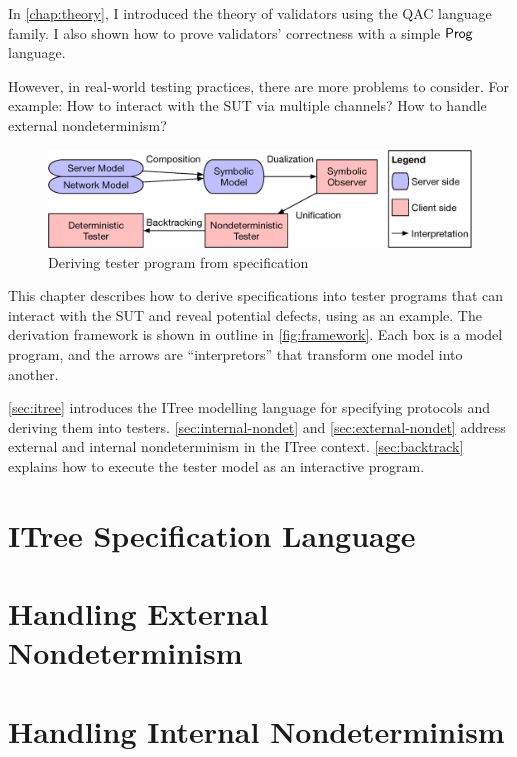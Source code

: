 In \autoref{chap:theory}, I introduced the theory of validators using the QAC
language family.  I also shown how to prove validators' correctness with a
simple $\mathsf{Prog}$ language.

However, in real-world testing practices, there are more problems to consider.
For example: How to interact with the SUT via multiple channels?  How to handle
external nondeterminism?

\begin{figure}
  \includegraphics[width=\linewidth]{figures/framework}
  \caption{Deriving tester program from specification}
  \label{fig:framework}
\end{figure}

This chapter describes how to derive specifications into tester programs that
can interact with the SUT and reveal potential defects, using \http as an
example.  The derivation framework is shown in outline in
\autoref{fig:framework}.  Each box is a model program, and the arrows are
``interpretors'' that transform one model into another.

\autoref{sec:itree} introduces the ITree modelling language for specifying
protocols and deriving them into testers.  \autoref{sec:internal-nondet} and
\autoref{sec:external-nondet} address external and internal nondeterminism in
the ITree context.  \autoref{sec:backtrack} explains how to execute the tester
model as an interactive program.

\section{ITree Specification Language}
\label{sec:itree}


\section{Handling External Nondeterminism}
\label{sec:external-nondet}


\section{Handling Internal Nondeterminism}
\label{sec:internal-nondet}


